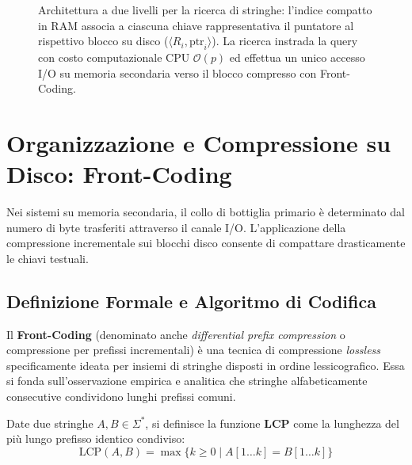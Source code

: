 \begin{figure}[H]
{%
}
\caption{Architettura a due livelli per la ricerca di stringhe: l'indice compatto in RAM associa a ciascuna chiave rappresentativa il puntatore al rispettivo blocco su disco ($\langle R_i, \text{ptr}_i \rangle$). La ricerca instrada la query con costo computazionale CPU $\mathcal{O}(p)$ ed effettua un unico accesso I/O su memoria secondaria verso il blocco compresso con Front-Coding.}
\label{fig:two-level-string-architecture}
\end{figure}

\FloatBarrier
\section{Organizzazione e Compressione su Disco: Front-Coding}
\label{sec:front-coding}

Nei sistemi su memoria secondaria, il collo di bottiglia primario \`e determinato dal numero di byte trasferiti attraverso il canale I/O. L'applicazione della compressione incrementale sui blocchi disco consente di compattare drasticamente le chiavi testuali.

\FloatBarrier
\subsection{Definizione Formale e Algoritmo di Codifica}
\label{subsec:definizione-algoritmo-front-coding}

Il \textbf{Front-Coding} (denominato anche \textit{differential prefix compression} o compressione per prefissi incrementali) \`e una tecnica di compressione \textit{lossless} specificamente ideata per insiemi di stringhe disposti in ordine lessicografico. Essa si fonda sull'osservazione empirica e analitica che stringhe alfabeticamente consecutive condividono lunghi prefissi comuni.

\begin{definition}
Date due stringhe $A, B \in \Sigma^*$, si definisce la funzione \textbf{LCP} come la lunghezza del pi\`u lungo prefisso identico condiviso:
\begin{equation}
  \text{LCP}(A, B) = \max \big\{ k \ge 0 \;\big|\; A[1 \dots k] = B[1 \dots k] \big\}
\end{equation}
\end{definition}

